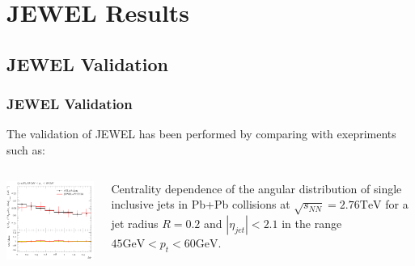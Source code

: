 \documentclass{beamer}
\begin{document}
\section{JEWEL Results}
\subsection{JEWEL Validation}

\begin{frame}\frametitle{JEWEL Validation}
    \begin{minipage}{1\textwidth}
	The validation of JEWEL has been performed by comparing with exepriments such as:    
    \end{minipage}
    \begin{columns}
    \begin{column}{0.5\textwidth}
	\begin{minipage}[l]{0.5\textwidth}
	\includegraphics[scale=0.5]{images/atlas_jewel.png}
	\end{minipage}
	\end{column}
    \begin{column}{0.5\textwidth}
	\begin{minipage}[r]{1\textwidth}
	Centrality dependence of the angular distribution of single inclusive jets in Pb+Pb collisions
	at $\sqrt{s_{NN}}=2.76\mathrm{TeV}$ for a jet radius $R=0.2$ and $|\eta_{jet}|<2.1$ in the
	range $45\mathrm{GeV}<p_t<60\mathrm{GeV}$.
	\end{minipage}
	\end{column}
	\end{columns}
\end{frame}
\end{document}
